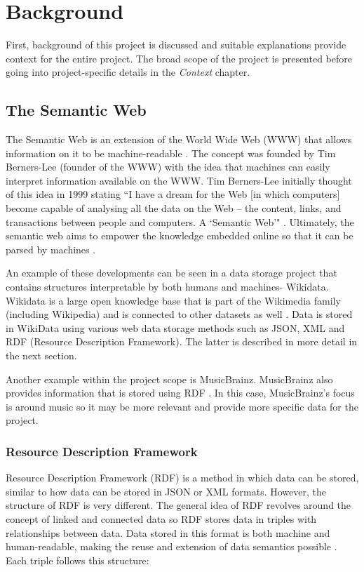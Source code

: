 \usetikzlibrary {arrows}
\usetikzlibrary {shapes.geometric}
\usetikzlibrary {patterns}

\chapter{Background}
First, background of this project is discussed and suitable explanations provide context for the entire project. The broad scope of the project is presented before going into project-specific details in the \textit{Context} chapter.

\section{The Semantic Web}
\hspace*{0.5cm} The Semantic Web is an extension of the World Wide Web (WWW) that allows information on it to be machine-readable \cite{semanticweb}. The concept was founded by Tim Berners-Lee (founder of the WWW) with the idea that machines can easily interpret information available on the WWW. Tim Berners-Lee initially thought of this idea in 1999 stating ``I have a dream for the Web [in which computers] become capable of analysing all the data on the Web – the content, links, and transactions between people and computers. A `Semantic Web'" \cite{berners-TBLBook}. Ultimately, the semantic web aims to empower the knowledge embedded online so that it can be parsed by machines \cite{semanticweb}. 

An example of these developments can be seen in a data storage project that contains structures interpretable by both humans and machines- Wikidata. Wikidata is a large open knowledge base that is part of the Wikimedia family (including Wikipedia) and is connected to other datasets as well \cite{wikidata}. Data is stored in WikiData using various web data storage methods such as JSON, XML and RDF (Resource Description Framework). The latter is described in more detail in the next section.  

Another example within the project scope is MusicBrainz. MusicBrainz also provides information that is stored using RDF \cite{musicbrainz}. In this case, MusicBrainz's focus is around music so it may be more relevant and provide more specific data for the project. 

\subsection{Resource Description Framework}
\hspace*{0.5cm} Resource Description Framework (RDF) is a method in which data can be stored, similar to how data can be stored in JSON or XML formats. However, the structure of RDF is very different. The general idea of RDF revolves around the concept of linked and connected data so RDF stores data in triples with relationships between data. Data stored in this format is both machine and human-readable, making the reuse and extension of data semantics possible \cite{rdf}. Each triple follows this structure: 

